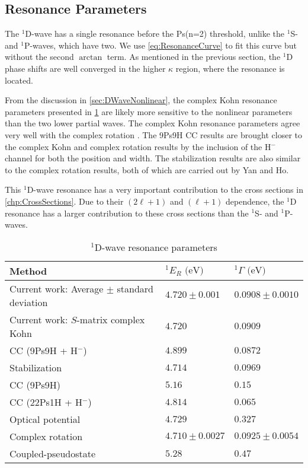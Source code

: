 \documentclass[Dissertation.tex]{subfiles}
\begin{document}
\subsection{Resonance Parameters}
\label{sec:DWaveResonance}

The $^1$D-wave has a single resonance before the Ps(n=2) threshold, unlike 
the $^1$S- and $^1$P-waves, which have two. We use \cref{eq:ResonanceCurve}
to fit this curve but without the second $\arctan$ term.
As mentioned in the previous section, the $^1$D phase shifts are
well converged in the higher $\kappa$ region, where the resonance
is located.

From the discussion in \cref{sec:DWaveNonlinear}, the complex Kohn resonance 
parameters presented in \cref{tab:DWaveResonancesOther} are likely more 
sensitive to the nonlinear parameters than the two lower partial waves. The
complex Kohn 
resonance parameters agree very well with the complex rotation \cite{Ho1998}.
The 9Ps9H CC results \cite{Blackwood2002} are brought closer to the complex
Kohn and complex rotation results by the inclusion of the H$^-$ channel for
both the position and width. The stabilization \cite{Yan2003} results are
also similar to the complex rotation results, both of which are carried out by
Yan and Ho.

This $^1$D-wave resonance has a very important contribution to the cross
sections in \cref{chp:CrossSections}. Due to their $(2\ell+1)$ and $(\ell+1)$
dependence, the $^1$D resonance has a larger contribution to these cross
sections than the $^1$S- and $^1$P-waves.


\setlength{\abovecaptionskip}{6pt}   %
\setlength{\belowcaptionskip}{6pt}   %
\begin{table}
\centering
\begin{tabular}{l l l}
\toprule
Method & $^1E_R \text{ (eV)}$ & $^1\Gamma \text{ (eV)}$ \\
\midrule
Current work: Average $\pm$ standard deviation & $4.720 \pm 0.001$ & $0.0908 \pm 0.0010$ \\
Current work: $S$-matrix complex Kohn & $4.720$ & $0.0909$ \\
CC (9Ps9H + H$^-$) \cite{Walters2004} & $4.899$ & $0.0872$ \\
Stabilization \cite{Yan2003} & $4.714$ & $0.0969$ \\
CC (9Ps9H) \cite{Blackwood2002} & $5.16$ & $0.15$ \\
CC (22Ps1H + H$^-$) \cite{Blackwood2002b} & $4.814$ & $0.065$ \\
Optical potential \cite{DiRienzi2002a} & $4.729$ & $0.327$ \\
Complex rotation \cite{Ho1998} & $4.710 \pm 0.0027$ & $0.0925 \pm 0.0054$  \\
Coupled-pseudostate \cite{Campbell1998} & $5.28$ & $0.47$ \\
\bottomrule
\end{tabular}
\caption{$^1$D-wave resonance parameters}
\label{tab:DWaveResonancesOther}
\end{table}
\end{document}
